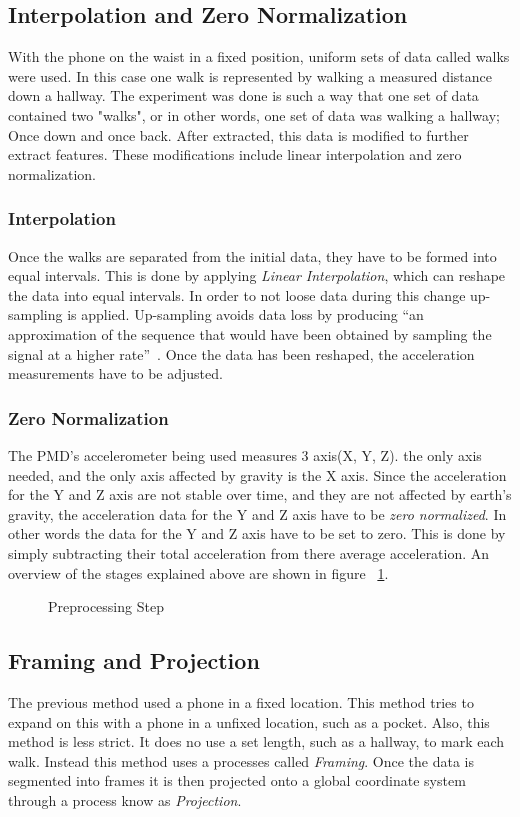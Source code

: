 \documentclass{sig-alternate}
\begin{document}
\subsection{Interpolation and Zero Normalization }	
	With the phone on the waist in a fixed position, uniform sets of data called walks were used. In this case one walk is represented by walking a measured distance down a hallway. The experiment was done is such a way that one set of data contained two "walks", or in other words, one set of data was walking a hallway; Once down and once back. After extracted, this data is modified to further extract features. These modifications include linear interpolation and zero normalization. 
	
\subsubsection{Interpolation} 
	Once the walks are separated from the initial data, they have to be formed into equal intervals. This is done by applying \textit{Linear Interpolation}, which can reshape the data  into equal intervals. In order to not loose data during this change up-sampling is applied. Up-sampling avoids data loss by producing ``an approximation of the sequence that would have been obtained by sampling the signal at a higher rate''~\cite{wiki1:2014}. Once the data has been reshaped, the acceleration measurements have to be adjusted. 
	
\subsubsection{Zero Normalization}
	The PMD's accelerometer being used measures 3 axis(X, Y, Z). the only axis needed, and the only axis affected by gravity is the X axis. Since the acceleration for the Y and Z axis are not stable over time, and they are not affected by earth's gravity, the acceleration data for the Y and Z axis have to be \textit{zero normalized}. In other words the data for the Y and Z axis have to be set to zero. This is done by simply subtracting their total acceleration from there average acceleration. An overview of the stages explained above are shown in figure ~\ref{fig:firstStep}.

\begin{figure}
\centering
{}
\caption{Preprocessing Step}
\label{fig:firstStep}
\end{figure}

\subsection{Framing and Projection}{
	The previous method used a phone in a fixed location. This method tries to expand on this with a phone in a unfixed location, such as a pocket. Also, this method is less strict. It does no use a set length, such as a hallway, to mark each walk. Instead this method uses a processes called \textit{Framing}. Once the data is segmented into frames it is then projected onto a global coordinate system through a process know as \textit{Projection}.
	}
\end{document}
